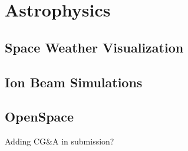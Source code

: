 \section{Astrophysics}
\label{contributions:physics}

\subsection{Space Weather Visualization}
\label{contributions:physics:spaceweather}
\cite{Bock14CME}

\subsection{Ion Beam Simulations}
\label{contributions:physics:ion}

\subsection{OpenSpace}
\label{contributions:physics:openspace}
\cite{Bock15bOpenSpace}
\cite{Bock15OpenSpace}

Adding CG\&A in submission?